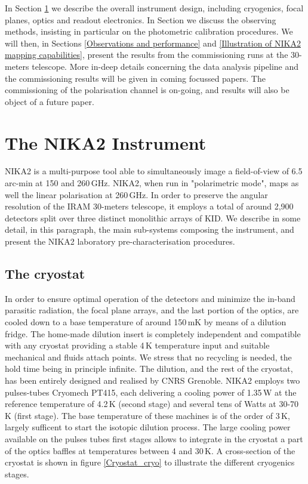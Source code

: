 \documentclass[]{aa} %
\begin{document}
In Section \ref{The NIKA2 Instrument} we describe the overall instrument design, including cryogenics, focal planes, optics and readout electronics. In Section \label{Measurement principle} we discuss the observing methods, insisting in particular on the photometric calibration procedures. We will then, in Sections \ref{Observations and performance} and \ref{Illustration of NIKA2 mapping capabilities}, present the results from the commissioning runs at the 30-meters telescope. More in-deep details concerning the data analysis pipeline and the commissioning results will be given in coming focussed papers. The commissioning of the polarisation channel is on-going, and results will also be object of a future paper.


\section{The NIKA2 Instrument}
\label{The NIKA2 Instrument}

NIKA2 is a multi-purpose tool able to simultaneously image a field-of-view of 6.5\,arc-min at 150 and 260\,GHz. NIKA2, when run in "polarimetric mode", maps as well the linear polarisation  at 260\,GHz. In order to preserve the angular resolution of the IRAM 30-meters telescope, it employs a total of around 2,900\,detectors split over three distinct monolithic arrays of KID. We describe in some detail, in this paragraph, the main sub-systems composing the instrument, and present the NIKA2 laboratory pre-characterisation procedures.

 \subsection{The cryostat}

In order to ensure optimal operation of the detectors and minimize the in-band parasitic radiation, the focal plane arrays, and the last portion of the optics, are cooled down to a base temperature of around 150\,mK by means of a dilution fridge. The home-made dilution insert is completely independent and compatible with any cryostat providing a stable 4\,K temperature input and suitable mechanical and fluids attach points. We stress that no recycling is needed, the hold time being in principle infinite. The dilution, and the rest of the cryostat, has been entirely designed and realised by CNRS Grenoble. NIKA2 employs two pulses-tubes Cryomech PT415, each delivering a cooling power of 1.35\,W at the reference temperature of 4.2\,K (second stage) and several tens of Watts at 30-70\,K (first stage). The base temperature of these machines is of the order of 3\,K, largely sufficent to start the isotopic dilution process. The large cooling power available on the pulses tubes first stages allows to integrate in the cryostat a part of the optics baffles at temperatures between 4 and 30\,K. A cross-section of the cryostat is shown in figure \ref{Cryostat_cryo} to illustrate the different cryogenics stages.
\end{document}
